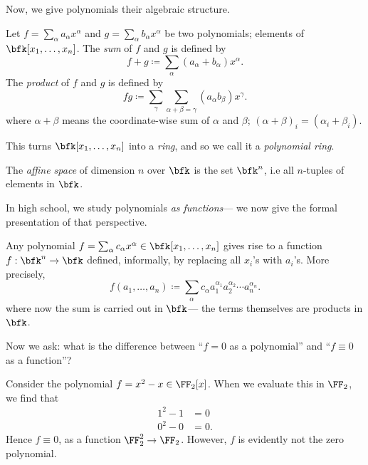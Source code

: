 \documentclass{article}
\begin{document}
Now, we give polynomials their algebraic structure.

\begin{definition}
    Let $f = \sum_\alpha a_\alpha x^\alpha$ and $g = \sum_\alpha b_\alpha x^\alpha$ be two polynomials; elements of $\bfk[x_1,\ldots,x_n]$.
    The \textit{sum} of $f$ and $g$ is defined by
    \[
        f + g \coloneq \sum_\alpha (a_\alpha + b_\alpha)x^\alpha.
    \]
    The \textit{product} of $f$ and $g$ is defined by
    \[
        fg \coloneq \sum_\gamma \sum_{\alpha + \beta = \gamma}(a_\alpha b_\beta)x^\gamma.
    \]
    where $\alpha + \beta$ means the coordinate-wise sum of $\alpha$ and $\beta$; $(\alpha + \beta)_i = (\alpha_i + \beta_i)$.
\end{definition}

This turns $\bfk[x_1,\ldots,x_n]$ into a \textit{ring}, and so we call it a \textit{polynomial ring}.


\begin{definition}
    The \textit{affine space} of dimension $n$ over $\bfk$ is the set $\bfk^n$, i.e all $n$-tuples of elements in $\bfk$.
\end{definition}

In high school, we study polynomials \textit{as functions}--- we now give the formal presentation of that perspective.

\begin{definition}
    Any polynomial $f = \sum_\alpha c_\alpha x^\alpha \in \bfk[x_1,\ldots,x_n]$ gives rise to a function $f: \bfk^n \to \bfk$ defined, informally, by replacing all $x_i$'s with $a_i$'s.
    More precisely,
    \[
        f(a_1,\ldots,a_n) \coloneq \sum_\alpha c_\alpha a_1^{\alpha_1} a_2^{\alpha_2} \cdots a_n^{\alpha_n}.
    \]
    where now the sum is carried out in $\bfk$--- the terms themselves are products in $\bfk$.
\end{definition}

Now we ask: what is the difference between ``$f = 0$ as a polynomial'' and ``$f \equiv 0$ as a function''?

\begin{example}
    Consider the polynomial $f = x^2-x \in \FF_2[x]$. 
    When we evaluate this in $\FF_2$, we find that
    \begin{align*}
        1^2 - 1 &= 0 \\
        0^2 - 0 &= 0.
    \end{align*}
    Hence $f \equiv 0$, as a function $\FF_2^2 \to \FF_2$.
    However, $f$ is evidently not the zero polynomial.
\end{example}
\end{document}

